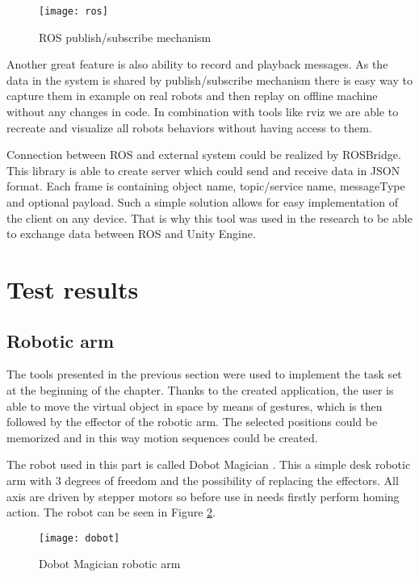 \documentclass[printmode,en]{mgr}
\begin{document}
\begin{figure}[!ht]
  \centering
    \texttt{[image: ros]}
  \caption{ROS publish/subscribe mechanism}
  \label{fig:ros}
\end{figure}

Another great feature is also ability to record and playback messages. As the data in the system is shared by publish/subscribe mechanism there is easy way to capture them in example on real robots and then replay on offline machine without any changes in code. In combination with tools like rviz we are able to recreate and visualize all robots behaviors without having access to them.

Connection between ROS and external system could be realized by ROSBridge. This library is able to create server which could send and receive data in JSON format. Each frame is containing object name, topic/service name, messageType and optional payload. Such a simple solution allows for easy implementation of the client on any device. That is why this tool was used in the research to be able to exchange data between ROS and Unity Engine.

\section{Test results}

\subsection{Robotic arm}
The tools presented in the previous section were used to implement the task set at the beginning of the chapter. Thanks to the created application, the user is able to move the virtual object in space by means of gestures, which is then followed by the effector of the robotic arm. The selected positions could be memorized and in this way motion sequences could be created.

The robot used in this part is called Dobot Magician \cite{dobot}. This a simple desk robotic arm with 3 degrees of freedom and the possibility of replacing the effectors. All axis are driven by stepper motors so before use in needs firstly perform homing action. The robot can be seen in Figure \ref{fig:dobot}.

\begin{figure}[!ht]
  \centering
    \texttt{[image: dobot]}
  \caption{Dobot Magician robotic arm \cite{dobot}}
  \label{fig:dobot}
\end{figure}
\end{document}
